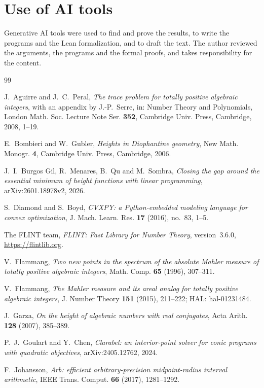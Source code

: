 \documentclass[11pt]{amsart}
\theoremstyle{remark}
\numberwithin{equation}{section}
\begin{document}
\section*{Use of AI tools}
Generative AI tools were used to find and prove the results, to write the programs and the Lean formalization, and to draft the text. The author reviewed the arguments, the programs and the formal proofs, and takes responsibility for the content.

\begin{thebibliography}{99}

 J.~Aguirre and J.~C.~Peral, \emph{The trace problem for totally positive algebraic integers}, with an appendix by J.-P.~Serre, in: Number Theory and Polynomials, London Math. Soc. Lecture Note Ser. \textbf{352}, Cambridge Univ. Press, Cambridge, 2008, 1--19.

 E.~Bombieri and W.~Gubler, \emph{Heights in Diophantine geometry}, New Math. Monogr. \textbf{4}, Cambridge Univ. Press, Cambridge, 2006.

 J.~I.~Burgos Gil, R.~Menares, B.~Qu and M.~Sombra, \emph{Closing the gap around the essential minimum of height functions with linear programming}, arXiv:2601.18978v2, 2026.

 S.~Diamond and S.~Boyd, \emph{CVXPY: a Python-embedded modeling language for convex optimization}, J. Mach. Learn. Res. \textbf{17} (2016), no.~83, 1--5.

 The FLINT team, \emph{FLINT: Fast Library for Number Theory}, version~3.6.0, \url{https://flintlib.org}.

 V.~Flammang, \emph{Two new points in the spectrum of the absolute Mahler measure of totally positive algebraic integers}, Math. Comp. \textbf{65} (1996), 307--311.

 V.~Flammang, \emph{The Mahler measure and its areal analog for totally positive algebraic integers}, J. Number Theory \textbf{151} (2015), 211--222; HAL: hal-01231484.

 J.~Garza, \emph{On the height of algebraic numbers with real conjugates}, Acta Arith. \textbf{128} (2007), 385--389.

 P.~J.~Goulart and Y.~Chen, \emph{Clarabel: an interior-point solver for conic programs with quadratic objectives}, arXiv:2405.12762, 2024.

 F.~Johansson, \emph{Arb: efficient arbitrary-precision midpoint-radius interval arithmetic}, IEEE Trans. Comput. \textbf{66} (2017), 1281--1292.


\end{thebibliography}
\end{document}
